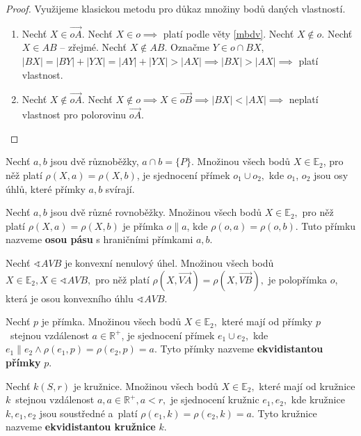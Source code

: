 \begin{proof} Využijeme klasickou metodu pro důkaz množiny bodů daných vlastností.
  \begin{enumerate}[$i.$]
    \item Nechť $X\in \overrightarrow{oA}$. Nechť $X\in o\implies$ platí podle věty \ref{mbdv}. Nechť $X\notin o$. Nechť $X\in AB$ -- zřejmé. Nechť $X\notin AB$. Označme $Y\in o \cap BX$, $|BX|=|BY|+|YX|=|AY|+|YX|>|AX|\implies |BX|>|AX|\implies$ platí vlastnost.
    \item Nechť $X\notin \overrightarrow{oA}$. Nechť $X\notin o \implies X\in \overrightarrow{oB}\implies |BX|<|AX|\implies$ neplatí vlastnost pro polorovinu $\overrightarrow{oA}.$ \qedhere
\end{enumerate}
\end{proof}

\begin{veta}
  Nechť $a,b$ jsou dvě různoběžky, $a\cap b = \{P\}.$ Množinou všech bodů $X\in \mathbb E_2$, pro něž platí $\rho(X,a)=\rho(X,b)$, je sjednocení přímek $o_1 \cup o_2,$ kde  $o_1$, $o_2$ jsou osy úhlů, které přímky $a,b$ svírají.
\end{veta}


\begin{definition}
  Nechť $a,b$ jsou dvě různé rovnoběžky. Množinou všech bodů $X\in \mathbb E_2,$ pro něž platí $\rho(X,a)=\rho(X,b)$ je přímka $o\parallel a$, kde $\rho(o,a)=\rho(o,b)$. Tuto přímku nazveme \textbf{osou pásu} s hraničními přímkami $a,b$.
\end{definition}

\begin{veta}
  Nechť $\sphericalangle AVB$ je konvexní nenulový úhel. Množinou všech bodů $X\in \mathbb E_2, X\in \sphericalangle AVB,$ pro něž platí $\rho(X, \overrightarrow{VA})=\rho(X,\overrightarrow{VB}),$ je polopřímka $o$, která je osou konvexního úhlu $\sphericalangle AVB.$
\end{veta}

\begin{definition}
  Nechť $p$ je přímka. Množinou všech bodů $X \in \mathbb E_2,$ které mají od přímky $p$~stejnou vzdálenost $a\in \mathbb R^+$, je sjednocení přímek $e_1 \cup e_2,$ kde $e_1 \parallel e_2 \land \rho(e_1,p)=\rho(e_2,p)=a$. Tyto přímky nazveme
  \textbf{ekvidistantou přímky} $p$.
\end{definition}

\begin{definition}
  Nechť $k(S,r)$ je kružnice. Množinou všech bodů $X\in \mathbb E_2,$ které mají od kružnice $k$~stejnou vzdálenost $a, a \in \mathbb R^+, a< r,$ je sjednocení kružnic $e_1, e_2,$ kde kružnice $k,e_1,e_2$ jsou soustředné a~platí $\rho(e_1,k)= \rho(e_2,k)=a.$ Tyto kružnice nazveme
  \textbf{ekvidistantou kružnice} $k$.
\end{definition}

